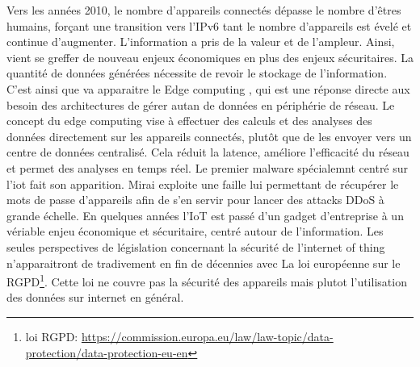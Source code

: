 Vers les années 2010, le nombre d'appareils connectés dépasse le nombre d'êtres humains, forçant une transition vers l'IPv6 tant le nombre d'appareils est évelé et continue d'augmenter. L'information a pris de la valeur et de l'ampleur. Ainsi, vient se greffer de nouveau enjeux économiques en plus des enjeux sécuritaires. La quantité de données générées nécessite de revoir le stockage de l'information. C'est ainsi que va apparaitre le Edge computing \cite{edge}, qui est une réponse directe aux besoin des architectures de gérer autan de données en périphérie de réseau. Le concept du edge computing vise à effectuer des calculs et des analyses des données directement sur les appareils connectés, plutôt que de les envoyer vers un centre de données centralisé. Cela réduit la latence, améliore l'efficacité du réseau et permet des analyses en temps réel. Le premier malware spécialemnt centré sur l'iot fait son apparition. Mirai\cite{Mirai} exploite une faille lui permettant de récupérer le mots de passe d'appareils afin de s'en servir pour lancer des attacks \ac{DDoS} à grande échelle. En quelques années l'\ac{IoT} est passé d'un gadget d'entreprise à un vériable enjeu économique et sécuritaire, centré autour de l'information. Les seules perspectives de législation concernant la sécurité de l'internet of thing n'apparaitront de tradivement en fin de décennies avec La loi européenne sur le \ac{RGPD}\footnote{loi RGPD: \href{https://commission.europa.eu/law/law-topic/data-protection/data-protection-eu_en}{{https://commission.europa.eu/law/law-topic/data-protection/data-protection-eu-en}}}. Cette loi ne couvre pas la sécurité des appareils mais plutot l'utilisation des données sur internet en général.

\vspace{0.1cm}

